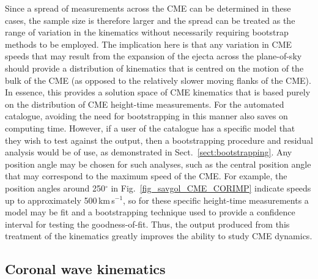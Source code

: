 \documentclass[structabstract]{aa}
\begin{document}
Since a spread of measurements across the CME can be determined in these cases, the sample size is therefore larger and the spread can be treated as the range of variation in the kinematics without necessarily requiring bootstrap methods to be employed. The implication here is that any variation in CME speeds that may result from the expansion of the ejecta across the plane-of-sky should provide a distribution of kinematics that is centred on the motion of the bulk of the CME (as opposed to the relatively slower moving flanks of the CME). In essence, this provides a solution space of CME kinematics that is based purely on the distribution of CME height-time measurements. For the automated catalogue, avoiding the need for bootstrapping in this manner also saves on computing time. However, if a user of the catalogue has a specific model that they wish to test against the output, then a bootstrapping procedure and residual analysis would be of use, as demonstrated in Sect.~\ref{sect:bootstrapping}. Any position angle may be chosen for such analyses, such as the central position angle that may correspond to the maximum speed of the CME. For example, the position angles around 250$^{\circ}$ in Fig.~\ref{fig_savgol_CME_CORIMP} indicate speeds up to approximately 500\,km\,s$^{-1}$, so for these specific height-time measurements a model may be fit and a bootstrapping technique used to provide a confidence interval for testing the goodness-of-fit. Thus, the output produced from this treatment of the kinematics greatly improves the ability to study CME dynamics.


\subsection{Coronal wave kinematics}
\label{subsect:corpita}
\end{document}
